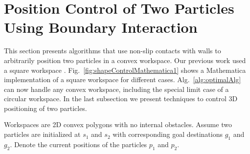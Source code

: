 

\section{Position Control of Two Particles Using Boundary Interaction}\label{sec:PostionControl2Robots}

This section presents algorithms that use non-slip contacts with walls to arbitrarily position two particles in a convex workspace. Our previous work used a square workspace \cite{shahrokhi2017algorithms}. Fig.~\ref{fig:shapeControlMathematica1} shows a Mathematica implementation of a square workspace for different cases. Alg.~\ref{alg:optimalAlg} can now handle any convex workspace, including the special limit case of a circular workspace. In the last subsection we present techniques to control 3D positioning of two particles.

Workspaces are 2D convex polygons with no internal obstacles. 
 Assume two particles are initialized at $s_1$ and $s_2$ with corresponding goal destinations $g_1$ and $g_2$. 
Denote the current positions of the particles  $p_1$ and $p_2$.

